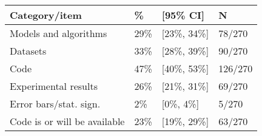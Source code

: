 \begin{tabular}{llll}
\hline
Category/item & \% & [95\% CI]  & N \\
\hline
Models and algorithms & 29\% & [23\%, 34\%] & 78/270\\
Datasets & 33\% & [28\%, 39\%] & 90/270\\
Code & 47\% & [40\%, 53\%] & 126/270\\
Experimental results & 26\% & [21\%, 31\%] & 69/270\\
Error bars/stat. sign.& 2\% & [0\%, 4\%] & 5/270\\
Code is or will be available & 23\% & [19\%, 29\%] & 63/270\\
\hline
\end{tabular}
